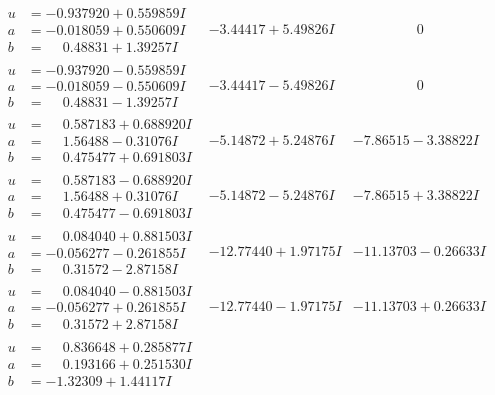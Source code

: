 \documentclass[1p]{elsarticle_modified}
\theoremstyle{definition}
\begin{document}
$$\begin{array}{c|c|c}
\begin{aligned}
u &= -0.937920 + 0.559859 I \\
a &= -0.018059 + 0.550609 I \\
b &= \phantom{-}0.48831 + 1.39257 I\end{aligned}
 & -3.44417 + 5.49826 I & \phantom{-0.000000 } 0 \\ \hline\begin{aligned}
u &= -0.937920 - 0.559859 I \\
a &= -0.018059 - 0.550609 I \\
b &= \phantom{-}0.48831 - 1.39257 I\end{aligned}
 & -3.44417 - 5.49826 I & \phantom{-0.000000 } 0 \\ \hline\begin{aligned}
u &= \phantom{-}0.587183 + 0.688920 I \\
a &= \phantom{-}1.56488 - 0.31076 I \\
b &= \phantom{-}0.475477 + 0.691803 I\end{aligned}
 & -5.14872 + 5.24876 I & -7.86515 - 3.38822 I \\ \hline\begin{aligned}
u &= \phantom{-}0.587183 - 0.688920 I \\
a &= \phantom{-}1.56488 + 0.31076 I \\
b &= \phantom{-}0.475477 - 0.691803 I\end{aligned}
 & -5.14872 - 5.24876 I & -7.86515 + 3.38822 I \\ \hline\begin{aligned}
u &= \phantom{-}0.084040 + 0.881503 I \\
a &= -0.056277 - 0.261855 I \\
b &= \phantom{-}0.31572 - 2.87158 I\end{aligned}
 & -12.77440 + 1.97175 I & -11.13703 - 0.26633 I \\ \hline\begin{aligned}
u &= \phantom{-}0.084040 - 0.881503 I \\
a &= -0.056277 + 0.261855 I \\
b &= \phantom{-}0.31572 + 2.87158 I\end{aligned}
 & -12.77440 - 1.97175 I & -11.13703 + 0.26633 I \\ \hline\begin{aligned}
u &= \phantom{-}0.836648 + 0.285877 I \\
a &= \phantom{-}0.193166 + 0.251530 I \\
b &= -1.32309 + 1.44117 I\end{aligned}

\end{array}$$
\end{document}
